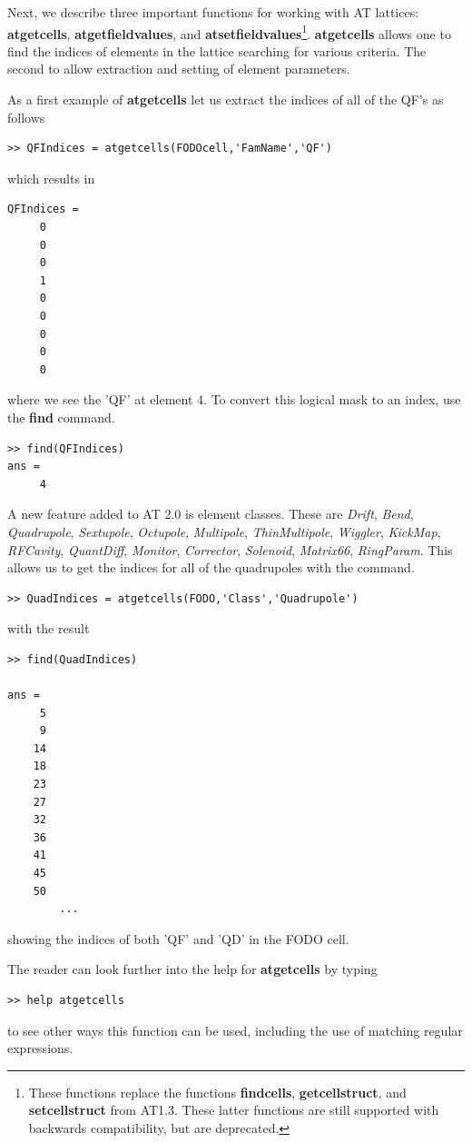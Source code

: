 \documentclass[acus]{article}
\newcommand{\mfun}[1]{{\bf{#1}}}
\newcommand{\class}[1]{{\it{#1}}}
\begin{document}
Next, we describe three important functions for working with AT lattices: \mfun{atgetcells},
\mfun{atgetfieldvalues}, and \mfun{atsetfieldvalues}\footnote{These functions replace the functions
\mfun{findcells}, \mfun{getcellstruct}, and \mfun{setcellstruct} from AT1.3.  These latter functions 
are still supported with backwards compatibility, but are deprecated.}.
\mfun{atgetcells} allows one to find the indices of elements in the lattice searching for 
various criteria.  The second to allow extraction and setting of element parameters.

As a first example of \mfun{atgetcells} let us extract the indices of all of the QF's as follows
\begin{verbatim}
>> QFIndices = atgetcells(FODOcell,'FamName','QF')
\end{verbatim}
which results in
\begin{verbatim}
QFIndices =
     0
     0
     0
     1
     0
     0
     0
     0
     0
\end{verbatim}
where we see the 'QF' at element 4.  To convert this logical mask to an index, use the \mfun{find}
command.
\begin{verbatim}
>> find(QFIndices)
ans =
     4
\end{verbatim}

A new feature added to AT 2.0 is element classes.  These are \class{Drift}, \class{Bend}, \class{Quadrupole}, \class{Sextupole}, \class{Octupole}, \class{Multipole}, \class{ThinMultipole}, 
\class{Wiggler}, \class{KickMap}, \class{RFCavity}, \class{QuantDiff}, \class{Monitor}, \class{Corrector}, \class{Solenoid}, 
\class{Matrix66}, \class{RingParam}.
This allows us to get the indices for all of the quadrupoles with the command.
 \begin{verbatim}
>> QuadIndices = atgetcells(FODO,'Class','Quadrupole')
\end{verbatim}
with the result
\begin{verbatim}
>> find(QuadIndices)

ans =
     5
     9
    14
    18
    23
    27
    32
    36
    41
    45
    50
		...
\end{verbatim}
showing the indices of both 'QF' and 'QD' in the FODO cell.  

The reader can look further into the help for \mfun{atgetcells} by typing
\begin{verbatim}
>> help atgetcells
\end{verbatim}
to see other ways this function can be used, including the use of matching 
regular expressions.
\end{document}
